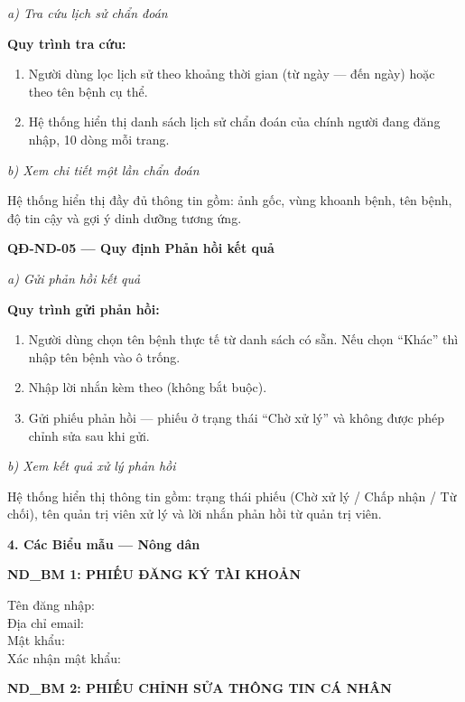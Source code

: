 \documentclass[12pt,a4paper]{article}
\begin{document}
\noindent\textit{a) Tra cứu lịch sử chẩn đoán}

\noindent\textbf{Quy trình tra cứu:}
\begin{enumerate}
    \item Người dùng lọc lịch sử theo khoảng thời gian (từ ngày --- đến ngày) hoặc theo tên bệnh cụ thể.
    \item Hệ thống hiển thị danh sách lịch sử chẩn đoán của chính người đang đăng nhập, 10 dòng mỗi trang.
\end{enumerate}

\noindent\textit{b) Xem chi tiết một lần chẩn đoán}

Hệ thống hiển thị đầy đủ thông tin gồm: ảnh gốc, vùng khoanh bệnh, tên bệnh, độ tin cậy và gợi ý dinh dưỡng tương ứng.

\vspace{0.3cm}
\noindent\textbf{QĐ-ND-05 --- Quy định Phản hồi kết quả}

\noindent\textit{a) Gửi phản hồi kết quả}

\noindent\textbf{Quy trình gửi phản hồi:}
\begin{enumerate}
    \item Người dùng chọn tên bệnh thực tế từ danh sách có sẵn. Nếu chọn ``Khác'' thì nhập tên bệnh vào ô trống.
    \item Nhập lời nhắn kèm theo (không bắt buộc).
    \item Gửi phiếu phản hồi --- phiếu ở trạng thái ``Chờ xử lý'' và không được phép chỉnh sửa sau khi gửi.
\end{enumerate}

\noindent\textit{b) Xem kết quả xử lý phản hồi}

Hệ thống hiển thị thông tin gồm: trạng thái phiếu (Chờ xử lý / Chấp nhận / Từ chối), tên quản trị viên xử lý và lời nhắn phản hồi từ quản trị viên.

\vspace{0.3cm}
\textbf{4. Các Biểu mẫu --- Nông dân}

\vspace{0.3cm}
\noindent\textbf{ND\_BM 1: PHIẾU ĐĂNG KÝ TÀI KHOẢN}

\noindent Tên đăng nhập: \dotfill \\
Địa chỉ email: \dotfill \\
Mật khẩu: \dotfill \\
Xác nhận mật khẩu: \dotfill

\vspace{0.3cm}
\noindent\textbf{ND\_BM 2: PHIẾU CHỈNH SỬA THÔNG TIN CÁ NHÂN}
\end{document}

